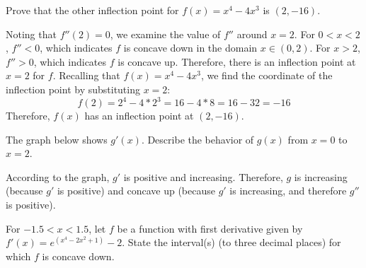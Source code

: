 \begin{Exercise}[label=concavity1]
Prove that the other inflection point for $f(x) = x^4-4x^3$ is $(2, -16)$.
\end{Exercise}

\begin{Answer}[ref=concavity1]
Noting that $f''(2)=0$, we examine the value of $f''$ around $x=2$. For $0<x<2$
, $f''<0$, which indicates $f$ is concave down in the domain $x \in (0,2)$. For 
$x>2$, $f''>0$, which indicates $f$ is concave up. Therefore, there is an 
inflection point at $x=2$ for $f$. Recalling that $f(x) = x^4-4x^3$, we find 
the coordinate of the inflection point by substituting $x=2$:
$$f(2) = 2^4-4*2^3=16-4*8=16-32=-16$$
Therefore, $f(x)$ has an inflection point at $(2, -16)$.
\end{Answer}

\begin{Exercise}[label=concavity2]
	The graph below shows $g'(x)$. Describe the behavior of $g(x)$ from $x=0$ 
	to $x=2$. 
\end{Exercise}

\begin{Answer}[ref=concavity2]
	According to the graph, $g'$ is positive and increasing. Therefore, $g$ is 
	increasing (because $g'$ is positive) and concave up (because $g'$ is 
	increasing, and therefore $g''$ is positive).
\end{Answer}

\begin{Exercise} For $-1.5 < x < 1.5$, let $f$ be a 
function with first derivative given by $f'(x) = e^{(x^4 - 2x^2 + 1)} - 2$. State 
the interval(s) (to three decimal places) for which $f$ is concave down. 
\end{Exercise}

